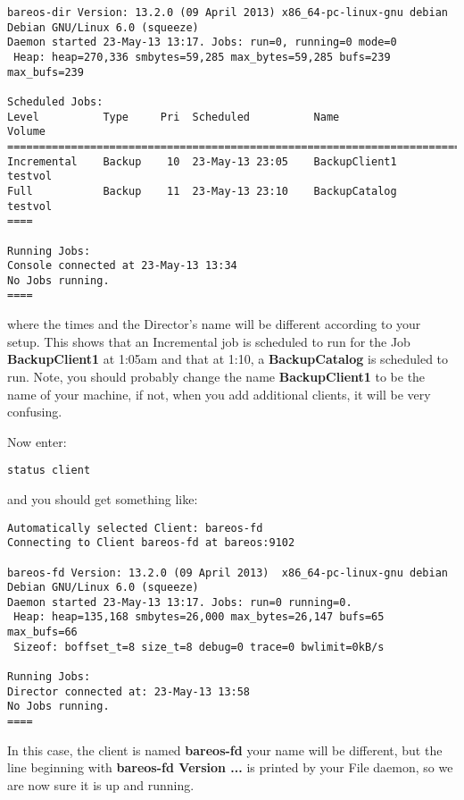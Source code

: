 \footnotesize
\begin{verbatim}
bareos-dir Version: 13.2.0 (09 April 2013) x86_64-pc-linux-gnu debian Debian GNU/Linux 6.0 (squeeze)
Daemon started 23-May-13 13:17. Jobs: run=0, running=0 mode=0
 Heap: heap=270,336 smbytes=59,285 max_bytes=59,285 bufs=239 max_bufs=239

Scheduled Jobs:
Level          Type     Pri  Scheduled          Name               Volume
===================================================================================
Incremental    Backup    10  23-May-13 23:05    BackupClient1      testvol
Full           Backup    11  23-May-13 23:10    BackupCatalog      testvol
====

Running Jobs:
Console connected at 23-May-13 13:34
No Jobs running.
====
\end{verbatim}
\normalsize

where the times and the Director's name will be different according to your
setup. This shows that an Incremental job is scheduled to run for the Job {\bf
BackupClient1} at 1:05am and that at 1:10, a {\bf BackupCatalog} is scheduled to
run. Note, you should probably change the name {\bf BackupClient1} to be the name of
your machine, if not, when you add additional clients, it will be very
confusing.

Now enter:

\footnotesize
\begin{verbatim}
status client
\end{verbatim}
\normalsize

and you should get something like:

\footnotesize
\begin{verbatim}
Automatically selected Client: bareos-fd
Connecting to Client bareos-fd at bareos:9102

bareos-fd Version: 13.2.0 (09 April 2013)  x86_64-pc-linux-gnu debian Debian GNU/Linux 6.0 (squeeze)
Daemon started 23-May-13 13:17. Jobs: run=0 running=0.
 Heap: heap=135,168 smbytes=26,000 max_bytes=26,147 bufs=65 max_bufs=66
 Sizeof: boffset_t=8 size_t=8 debug=0 trace=0 bwlimit=0kB/s

Running Jobs:
Director connected at: 23-May-13 13:58
No Jobs running.
====
\end{verbatim}
\normalsize

In this case, the client is named {\bf bareos-fd} your name will be different,
but the line beginning with {\bf bareos-fd Version ...} is printed by your File
daemon, so we are now sure it is up and running.

